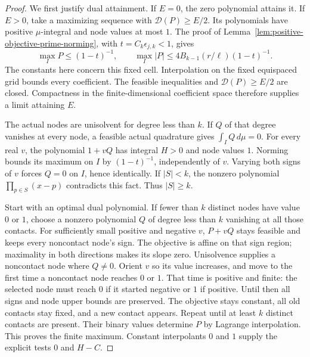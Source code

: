 \documentclass[11pt]{article}
\theoremstyle{definition}
\begin{document}
\begin{proof}
We first justify dual attainment. If $E=0$, the zero polynomial
attains it. If $E>0$, take a maximizing sequence with
$\mathcal D(P)\ge E/2$. Its polynomials have positive
$\mu$-integral and node values at most $1$. The proof of
Lemma~\ref{lem:positive-objective-prime-norming}, with
$t=C_k\epsilon_{j,k}<1$, gives
\[
 \max_I P\le(1-t)^{-1},\qquad
 \max_I|P|\le4B_{k-1}(r/\ell)(1-t)^{-1}.
\]
The constants here concern this fixed cell.
Interpolation on the fixed equispaced grid bounds every
coefficient. The feasible inequalities and
$\mathcal D(P)\ge E/2$ are closed. Compactness in the
finite-dimensional coefficient space therefore supplies
a limit attaining $E$.

The actual nodes are unisolvent for degree less than $k$.
If $Q$ of that degree vanishes at every node, a feasible
actual quadrature gives $\int_I Q\,d\mu=0$.
For every real $v$, the polynomial $1+vQ$ has integral
$H>0$ and node values $1$. Norming bounds its maximum on
$I$ by $(1-t)^{-1}$, independently of $v$.
Varying both signs of $v$ forces $Q=0$ on $I$, hence
identically. If $|S|<k$, the nonzero polynomial
$\prod_{p\in S}(x-p)$ contradicts this fact.
Thus $|S|\ge k$.

Start with an optimal dual polynomial.
If fewer than $k$ distinct nodes have value $0$ or $1$,
choose a nonzero polynomial $Q$ of degree less than $k$
vanishing at all those contacts.
For sufficiently small positive and negative $v$,
$P+vQ$ stays feasible and keeps every noncontact node's
sign. The objective is affine on that sign region;
maximality in both directions makes its slope zero.
Unisolvence supplies a noncontact node where $Q\ne0$.
Orient $v$ so its value increases, and move to the first
time a noncontact node reaches $0$ or $1$.
That time is positive and finite: the selected node
must reach $0$ if it started negative or $1$ if positive.
Until then all signs and node upper bounds are preserved.
The objective stays constant, all old contacts stay fixed,
and a new contact appears. Repeat until at least $k$
distinct contacts are present. Their binary values
determine $P$ by Lagrange interpolation.
This proves the finite maximum. Constant interpolants
$0$ and $1$ supply the explicit tests $0$ and $H-C$.


\end{proof}
\end{document}
